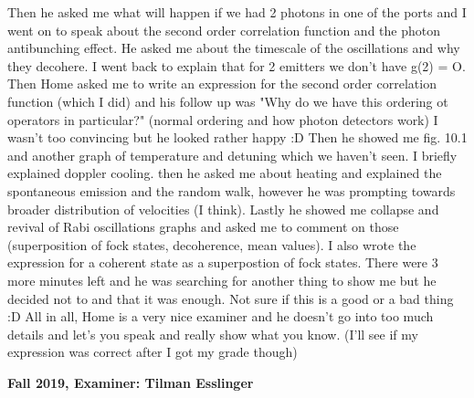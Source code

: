 \documentclass{article}%
\begin{document}
\begin{enumerate}
Then he asked me what will happen if we had 2 photons in one of the ports and I went on to speak about the second order correlation function and the photon antibunching effect. He asked me about the timescale of the oscillations and why they decohere. I went back to explain that for 2 emitters we don't have g(2) = O. Then Home asked me to write an expression for the second order correlation function (which I did) and his follow up was "Why do we have this ordering ot operators in particular?" (normal ordering and how photon detectors work) I wasn't too convincing but he looked rather happy :D\newline%
Then he showed me fig. 10.1 and another graph of temperature and detuning which we haven't seen. I briefly explained doppler cooling. then he asked me about heating and explained the spontaneous emission and the random walk, however he was prompting towards broader distribution of velocities (I think). Lastly he showed me collapse and revival of Rabi oscillations graphs and asked me to comment on those (superposition of fock states, decoherence, mean values). I also wrote the expression for a coherent state as a superpostion of fock states.\newline%
There were 3 more minutes left and he was searching for another thing to show me but he decided not to and that it was enough. Not sure if this is a good or a bad thing :D\newline%
All in all, Home is a very nice examiner and he doesn't go into too much details and let's you speak and really show what you know. (I'll see if my expression was correct after I got my grade though)%
\end{enumerate}%
\newpage%
\begin{center}%
\begin{large}%
\textbf{Fall 2019, Examiner: Tilman Esslinger}%
\end{large}%
\end{center}%
\end{document}
